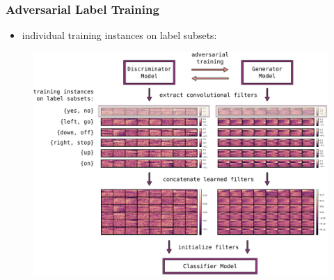 \begin{frame}
  \frametitle{Adversarial Label Training}
  \begin{itemize}
    \item individual training instances on label subsets:
  \end{itemize}
  \begin{figure} \includegraphics[height=0.7\textheight]{../4_nn/figs/nn_adv_label_scheme.pdf} \end{figure}
\end{frame}

